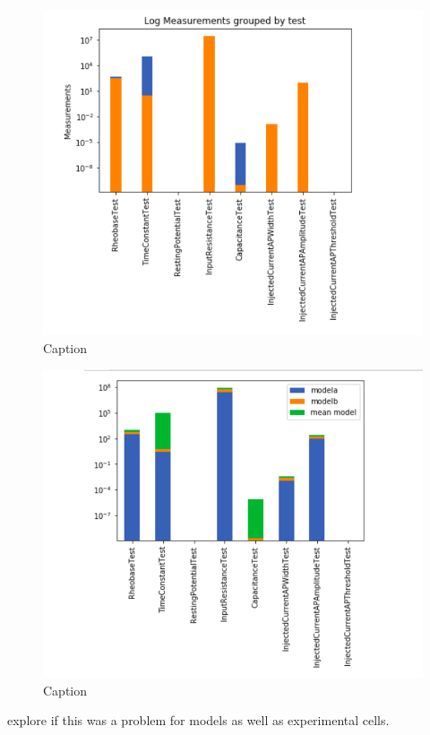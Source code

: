 \begin{figure}
    \centering
    \includegraphics{figures/mean_model_mean_test.png}
    \caption{Caption}
    \label{fig:my_label}
\end{figure}

\begin{figure}
    \centering
    \includegraphics{figures/mean_model_mean_test2.png}
    \caption{Caption}
    \label{fig:my_label}
\end{figure}

explore if this was a problem for models as well as experimental cells.